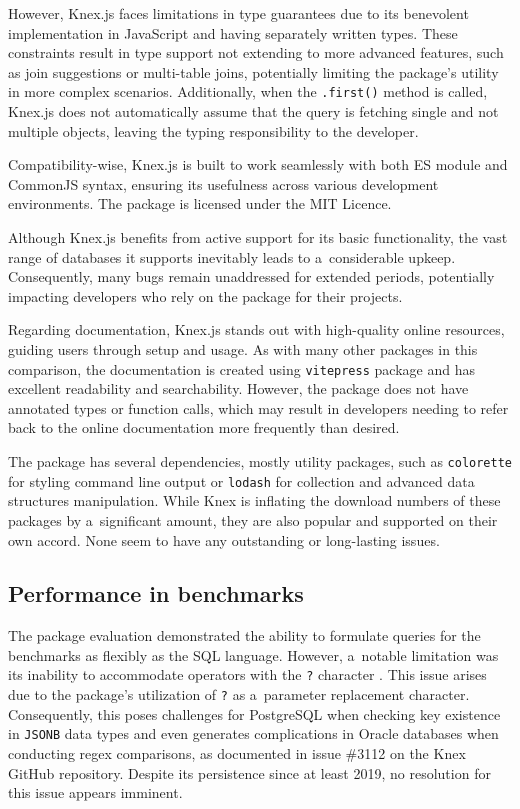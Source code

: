 However, Knex.js faces limitations in type guarantees due to its benevolent
implementation in JavaScript and having separately written types. These
constraints result in type support not extending to more advanced features, such
as join suggestions or multi-table joins, potentially limiting the package's
utility in more complex scenarios. Additionally, when the \texttt{.first()}
method is called, Knex.js does not automatically assume that the query is
fetching single and not multiple objects, leaving the typing responsibility to
the developer.

Compatibility-wise, Knex.js is built to work seamlessly with both ES module and
CommonJS syntax, ensuring its usefulness across various development
environments. The package is licensed under the MIT Licence.


Although Knex.js benefits from active support for its basic functionality, the
vast range of databases it supports inevitably leads to a~considerable upkeep.
Consequently, many bugs remain unaddressed for extended periods, potentially
impacting developers who rely on the package for their projects.

Regarding documentation, Knex.js stands out with high-quality online resources,
guiding users through setup and usage. As with many other packages in this
comparison, the documentation is created using \texttt{vitepress} package and
has excellent readability and searchability. However, the package does not have
annotated types or function calls, which may result in developers needing to
refer back to the online documentation more frequently than desired.

The package has several dependencies, mostly utility packages, such as
\texttt{colorette} for styling command line output or \texttt{lodash} for
collection and advanced data structures manipulation. While Knex is inflating
the download numbers of these packages by a~significant amount, they are also
popular and supported on their own accord. None seem to have any outstanding or
long-lasting issues.

\subsection*{Performance in benchmarks}

The package evaluation demonstrated the ability to formulate queries for the
benchmarks as flexibly as the SQL language. However, a~notable limitation was
its inability to accommodate operators with the \texttt{?} character
\cite{knexJSONIssue1}. This issue arises due to the package's utilization of
\texttt{?} as a~parameter replacement character. Consequently, this poses
challenges for PostgreSQL when checking key existence in \texttt{JSONB} data types and
even generates complications in Oracle databases when conducting regex
comparisons, as documented in issue \#3112 \cite{knexJSONIssue2} on the Knex
GitHub repository. Despite its persistence since at least 2019, no resolution
for this issue appears imminent.

